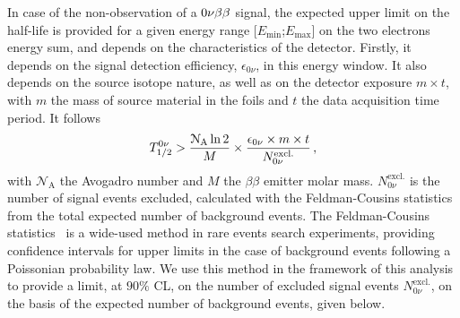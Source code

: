 In case of the non-observation of a $0\nu\beta\beta$ signal, the expected upper limit on the half-life is provided for a given energy range [$E_{\text{min}}$;$E_{\text{max}}$] on the two electrons energy sum, and depends on the characteristics of the detector.
Firstly, it depends on the signal detection efficiency, $\epsilon_{0\nu}$, in this energy window.
It also depends on the source isotope nature, as well as on the detector exposure $m\times t$, with $m$ the mass of source material in the foils and $t$ the data acquisition time period.
It follows
\begin{equation}
  T_{1/2}^{0\nu} > \frac{\mathcal{N}_{\text{A}}\ln{2}}{M}\times \frac{\epsilon_{0\nu}\times m\times t}{N_{0\nu}^{\text{excl.}}}\,,
  \label{eq:tbeta_limit}
\end{equation}
with $\mathcal{N}_{\text{A}}$ the Avogadro number and $M$ the $\beta\beta$ emitter molar mass.
$N_{0\nu}^{\text{excl.}}$ is the number of signal events excluded, calculated with the Feldman-Cousins statistics from the total expected number of background events.
The Feldman-Cousins statistics~\cite{art:feld-cous} is a wide-used method in rare events search experiments, providing confidence intervals for upper limits in the case of background events following a Poissonian probability law.
We use this method in the framework of this analysis to provide a limit, at $90\%$ CL, on the number of excluded signal events $N_{0\nu}^{\text{excl.}}$, on the basis of the expected number of background events, given below.

